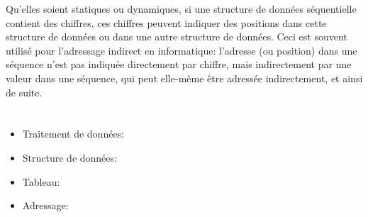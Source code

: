 {{Qu’elles soient statiques ou dynamiques, si une structure de données séquentielle contient des chiffres, ces chiffres peuvent indiquer des positions dans cette structure de données ou dans une autre structure de données. Ceci est souvent utilisé pour l’adressage indirect en informatique: l’adresse (ou position) dans une séquence n’est pas indiquée directement par chiffre, mais indirectement par une valeur dans une séquence, qui peut elle-même être adressée indirectement, et ainsi de suite.



\section*{\BrochureWebsitesAndKeywords}
{\raggedright
\begin{itemize}
  \item Traitement de données: \href{https://fr.wikipedia.org/wiki/Traitement_de_donn\%C3\%A9es}{}
  \item Structure de données: \href{https://fr.wikipedia.org/wiki/Structure_de_donn\%C3\%A9es}{}
  \item Tableau: \href{https://fr.wikipedia.org/wiki/Tableau_(structure_de_donn\%C3\%A9es)}{}
  \item Adressage: \href{https://fr.wikipedia.org/wiki/Mode_d\%27adressage}{}
\end{itemize}


}

}{}

\def\AuthorBaumannW{} %
\def\AuthorMilevskiZ{} %
\def\AuthorMukundM{} %
\def\AuthorDasovicD{} %
\def\AuthorPohlW{} %
\def\AuthorSpielerB{} %
\def\AuthorDatzkoS{} %
\def\AuthorPelletE{} %

\newpage}{}

